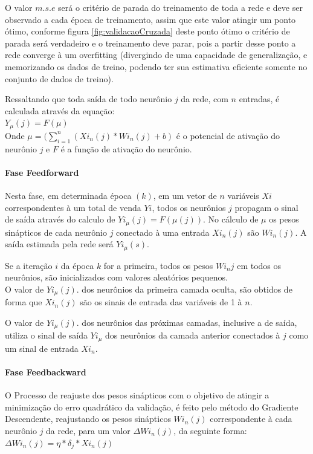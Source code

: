             O valor $m.s.e$ será o critério de parada do treinamento de toda a rede e deve ser observado a cada época de treinamento, assim que este valor atingir um ponto ótimo, conforme figura \ref{fig:validacaoCruzada} deste ponto ótimo o critério de parada será verdadeiro e o treinamento deve parar, pois a partir desse ponto a rede converge à um overfitting (divergindo de uma capacidade de generalização, e memorizando os dados de treino, podendo ter sua estimativa eficiente somente no conjunto de dados de treino).
            
            Ressaltando que toda saída de todo neurônio $j$ da rede, com $n$ entradas, é calculada através da equação:\\
            $ Y_{\mu}(j) = F(\mu)$\\
            Onde $\mu = (\sum_{i=1}^{n} (Xi_{n}(j)*Wi_{n}(j) + b)$ é o potencial de ativação do neurônio $j$ e $F$ é a função de ativação do neurônio.
            
           \paragraph*{Fase Feedforward}
            Nesta fase, em determinada época $(k)$, em um vetor de $n$ variáveis $Xi$ correspondentes à um total de venda $Yi$, todos os neurônios $j$ propagam o sinal de saída através do calculo de $Yi_{\mu}(j) = F(\mu(j))$. No cálculo de $\mu$ os pesos sinápticos de cada neurônio $j$ conectado à uma entrada $Xi_{n}(j)$ são $Wi_{n}(j)$. A saída estimada pela rede será $Yi_{\mu}(s)$.
            
            Se a iteração $i$ da época $k$ for a primeira, todos os pesos $Wi_{n}j$ em todos os neurônios, são inicializados com valores aleatórios pequenos.\\ 
            
            O valor de $Yi_{\mu}(j)$. dos neurônios da primeira camada oculta, são obtidos de forma que $Xi_{n}(j)$ são os sinais de entrada das variáveis de 1 à $n$.
            
            O valor de $Yi_{\mu}(j)$. dos neurônios das próximas camadas, inclusive a de saída, utiliza o sinal de saída $Yi_{\mu}$ dos neurônios da camada anterior conectados à $j$ como um sinal de entrada $Xi_{n}$.
            
            \paragraph*{Fase Feedbackward}
            O Processo de reajuste dos pesos sinápticos com o objetivo de atingir a minimização do erro quadrático da validação, é feito pelo método do Gradiente Descendente, reajustando os pesos sinápticos $Wi_{n}(j)$ correspondente à cada neurônio $j$ da rede, para um valor $\Delta Wi_{n}(j)$, da seguinte forma:\\
            $\Delta Wi_{n}(j) = \eta*\delta_j*Xi_{n}(j)$\\
            
